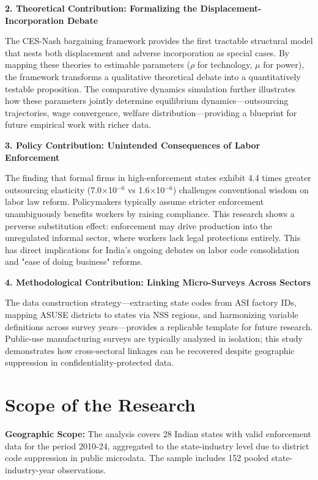 \textbf{2. Theoretical Contribution: Formalizing the Displacement-Incorporation Debate}

The CES-Nash bargaining framework provides the first tractable structural model that nests both displacement and adverse incorporation as special cases. By mapping these theories to estimable parameters ($\rho$ for technology, $\mu$ for power), the framework transforms a qualitative theoretical debate into a quantitatively testable proposition. The comparative dynamics simulation further illustrates how these parameters jointly determine equilibrium dynamics—outsourcing trajectories, wage convergence, welfare distribution—providing a blueprint for future empirical work with richer data.

\textbf{3. Policy Contribution: Unintended Consequences of Labor Enforcement}

The finding that formal firms in high-enforcement states exhibit 4.4 times greater outsourcing elasticity (7.0$\times$10$^{-6}$ vs 1.6$\times$10$^{-6}$) challenges conventional wisdom on labor law reform. Policymakers typically assume stricter enforcement unambiguously benefits workers by raising compliance. This research shows a perverse substitution effect: enforcement may drive production into the unregulated informal sector, where workers lack legal protections entirely. This has direct implications for India's ongoing debates on labor code consolidation and "ease of doing business" reforms.

\textbf{4. Methodological Contribution: Linking Micro-Surveys Across Sectors}

The data construction strategy—extracting state codes from ASI factory IDs, mapping ASUSE districts to states via NSS regions, and harmonizing variable definitions across survey years—provides a replicable template for future research. Public-use manufacturing surveys are typically analyzed in isolation; this study demonstrates how cross-sectoral linkages can be recovered despite geographic suppression in confidentiality-protected data.

\section{Scope of the Research}

\textbf{Geographic Scope:} The analysis covers 28 Indian states with valid enforcement data for the period 2010-24, aggregated to the state-industry level due to district code suppression in public microdata. The sample includes 152 pooled state-industry-year observations.

